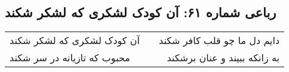 \begin{center}
\section*{رباعی شماره ۶۱: آن کودک لشکری که لشکر شکند}
\label{sec:061}
\begin{longtable}{l p{0.5cm} r}
آن کودک لشکری که لشکر شکند
&&
دایم دل ما چو قلب کافر شکند
\\
محبوب که تازیانه در سر شکند
&&
به زانکه ببیند و عنان برشکند
\\
\end{longtable}
\end{center}
